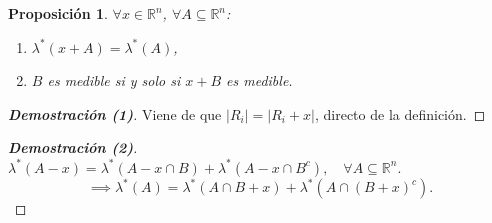 \documentclass{article}
\newtheorem{proposition}[theorem]{Proposición}
\theoremstyle{definition}
\theoremstyle{remark}
\numberwithin{equation}{section}
\newcommand{\R}{\mathbb{R}}
\newcommand{\lam}{\lambda}
\newcommand{\abs}[1]{\left| #1 \right|}
\newcommand{\dem}[1]{\textbf{Demostración (#1)}}
\begin{document}
\begin{proposition}
  $\forall x\in \R^n$, $\forall A \subseteq \R^n$:
  \begin{enumerate}[(1)]
    \item $\lam^*(x + A) = \lam^*(A)$,
    \item $B$ es medible si y solo si $x + B$ es medible.
  \end{enumerate}
\end{proposition}
\begin{proof}
  [\dem{1}]
  Viene de que $\abs{R_i} = \abs{R_i + x}$, directo de la definición. %
\end{proof}
\begin{proof}
  [\dem{2}]
  $\lam^*(A-x) = \lam^*(A-x \cap B) + \lam^*(A-x \cap B^c), \quad \forall A \subseteq \R^n$.
  \[\implies \lam^*(A) = \lam^*(A \cap B+x) + \lam^*(A \cap (B+x)^c).\]
\end{proof}
\end{document}
